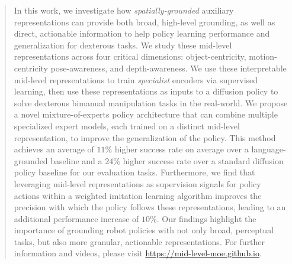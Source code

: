 \documentclass[conference,dvipsnames]{IEEEtran}
\begin{document}
\begin{abstract}
%
%
%

In this work, we investigate how \textit{spatially-grounded} auxiliary representations can provide both broad, high-level grounding, as well as direct, actionable information to help policy learning performance and generalization for dexterous tasks. We study these mid-level representations across four critical dimensions: object-centricity, motion-centricity pose-awareness, and depth-awareness. 
%
We use these interpretable mid-level representations to train \emph{specialist} encoders via supervised learning, then use these representations as inputs to a diffusion policy to solve dexterous bimanual manipulation tasks in the real-world.
%
We propose a novel mixture-of-experts policy architecture that can combine multiple specialized expert models, each trained on a distinct mid-level representation, to improve the generalization of the policy. This method achieves an average of $11\%$ higher success rate on average over a language-grounded baseline and a $24\%$ higher success rate over a standard diffusion policy baseline for our evaluation tasks. Furthermore, we find that leveraging mid-level representations as supervision signals for policy actions within a weighted imitation learning algorithm improves the precision with which the policy follows these representations, leading to an additional performance increase of $10\%$.
%
%
Our findings highlight the importance of grounding robot policies with not only broad, perceptual tasks, but also more granular, actionable representations. For further information and videos, please visit \url{https://mid-level-moe.github.io}.
\end{abstract}
\end{document}
